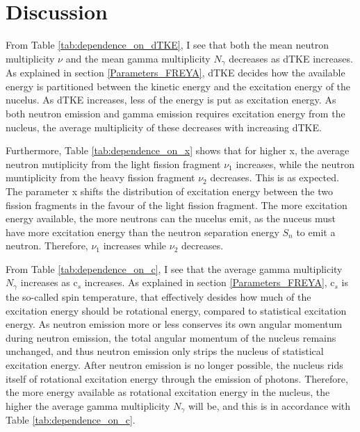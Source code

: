 \documentclass[]{article}
\begin{document}
\section{Discussion}
\label{Discussion}

From Table \ref{tab:dependence_on_dTKE}, I see that both the mean neutron multiplicity $\nu$ and the mean gamma multiplicity $N_{\gamma}$ decreases as dTKE increases. As explained in section \ref{Parameters_FREYA}, dTKE decides how the available energy is partitioned between the kinetic energy and the excitation energy of the nucelus. As dTKE increases, less of the energy is put as excitation energy. As both neutron emission and gamma emission requires excitation energy from the nucleus, the average multiplicity of these decreases with increasing dTKE.\par 
\vspace{3mm}

Furthermore, Table \ref{tab:dependence_on_x} shows that for higher x, the average neutron mutiplicity from the light fission fragment $\nu_1$ increases, while the neutron muntiplicity from the heavy fission fragment $\nu_2$ decreases. This is as expected. The parameter x shifts the distribution of excitation energy between the two fission fragments in the favour of the light fission fragment. The more excitation energy available, the more neutrons can the nucelus emit, as the nuceus must have more excitation energy than the neutron separation energy $S_n$ to emit a neutron. Therefore, $\nu_1$ increases while $\nu_2$ decreases. \par 
\vspace{3mm}

From Table \ref{tab:dependence_on_c}, I see that the average gamma multiplicity $N_{\gamma}$ increases as c$_s$ increases. As explained in section \ref{Parameters_FREYA}, c$_s$ is the so-called spin temperature, that effectively desides how much of the excitation energy should be rotational energy, compared to statistical excitation energy. As neutron emission more or less conserves its own angular momentum during neutron emission, the total angular momentum of the nucleus remains unchanged, and thus neutron emission only strips the nucleus of statistical excitation energy. After neutron emission is no longer possible, the nucleus rids itself of rotational excitation energy through the emission of photons. Therefore, the more energy available as rotational excitation energy in the nucleus, the higher the average gamma multiplicity $N_{\gamma}$ will be, and this is in accordance with Table \ref{tab:dependence_on_c}.
\par 
\vspace{3mm}
\end{document}
